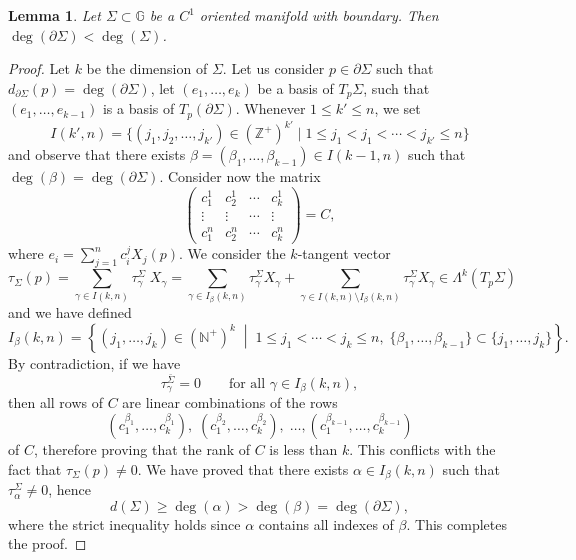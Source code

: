 \documentclass[dvipsnames]{amsart}
\newtheorem{lemma}[theorem]{Lemma}
\theoremstyle{definition}
\theoremstyle{definition}
\numberwithin{equation}{section}
\newcommand{\Z}{\mathbb{Z}}
\newcommand{\G}{\mathbb{G}}
\begin{document}
\begin{lemma}\label{lem: deg boundary less}
Let $\Sigma\subset\G$ be a $C^1$ oriented manifold with boundary.  Then $\deg(\partial \Sigma)<\deg(\Sigma)$.
\end{lemma}
\begin{proof}
Let $k$ be the dimension of $\Sigma$. Let us consider $p\in\partial \Sigma$ such that $d_{\partial\Sigma}(p)=\deg(\partial \Sigma)$, let $(e_1,\ldots,e_k)$ be a basis of $T_p\Sigma$, such that $(e_1,\ldots,e_{k-1})$ is a basis of $T_p(\partial \Sigma)$. Whenever $1\le k'\le n$, we set
\[
I(k',n)=\{(j_1,j_2,\ldots,j_{k'})\in(\Z^+)^{k'}\mid  1\le j_1<j_1<\cdots<j_{k'}\le n \}
\]
and observe that there exists $\beta=(\beta_1,\ldots,\beta_{k-1})\in I(k-1,n)$ such that $\deg(\beta)=\deg(\partial \Sigma)$.
Consider now the matrix
\[
\left(
\begin{array}{cccc}
c_1^1 & c_2^1 & \cdots  & c_k^1 \\
\vdots & \vdots & \cdots & \vdots \\
c_1^n & c_2^n & \cdots  & c_k^n
\end{array}
\right)
=
C,
\]
where $e_i=\sum_{j=1}^n c_i^j X_j(p)$. We consider the $k$-tangent vector 
\[
\tau_{\Sigma}(p)=\sum_{\gamma\in I(k,n)}\tau_{\gamma}^{\Sigma}\; X_{\gamma}
=\sum_{\gamma\in I_{\beta}(k,n)}\tau_{\gamma}^{\Sigma} X_{\gamma}
+\sum_{\gamma\in I(k,n)\setminus I_{\beta}(k,n)}\tau_{\gamma}^{\Sigma} X_{\gamma}
\in\Lambda^k(T_p\Sigma)
\]
and we have defined
\[
I_{\beta}(k,n)
=
\left\{
(j_1,\ldots,j_k)\in (\mathbb N^+)^k
\;\middle|\;
1\leq j_1<\cdots<j_k\leq n,\;
\{\beta_1,\ldots,\beta_{k-1}\}
\subset
\{j_1,\ldots,j_k\}
\right\}.
\]
By contradiction, if we have 
\[
\tau_{\gamma}^{\bar\Sigma}=0
\qquad
\text{for all } \gamma\in I_{\beta}(k,n),
\]
then all rows of \(C\) are linear combinations of the rows
\[
(c_1^{\beta_1},\ldots,c_k^{\beta_1}), \; 
(c_1^{\beta_2},\ldots,c_k^{\beta_2}), \; 
\ldots,
(c_1^{\beta_{k-1}},\ldots,c_k^{\beta_{k-1}})
\]
of \(C\), therefore proving that the rank of $C$ is less than $k$. 
This conflicts with the fact that $\tau_\Sigma(p)\neq0$.
We have proved that there exists $\alpha\in I_{\beta}(k,n)$ such that 
$\tau^\Sigma_{\alpha}\neq0$, hence 
\[
d(\Sigma)\ge \deg(\alpha)>\deg(\beta)=\deg(\partial \Sigma),
\]
where the strict inequality holds since $\alpha$ contains all indexes of $\beta$.
This completes the proof.
\end{proof}
\end{document}
